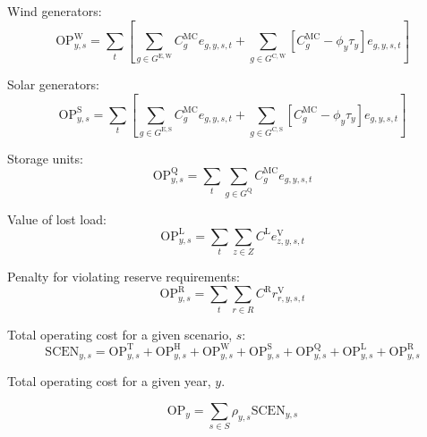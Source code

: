 \documentclass{article}
\newcommand{\sGeneratorsExistingWind}{G^{\mathrm{E,W}}}
\newcommand{\sGeneratorsExistingSolar}{G^{\mathrm{E,S}}}
\newcommand{\sGeneratorsCandidateWind}{G^{\mathrm{C,W}}}
\newcommand{\sGeneratorsCandidateSolar}{G^{\mathrm{C,S}}}
\newcommand{\sStorage}{G^{\mathrm{Q}}}
\newcommand{\sScenarios}{S}
\newcommand{\sZones}{Z}
\newcommand{\sRegions}{R}
\newcommand{\iGenerator}{g}
\newcommand{\iYear}{y}
\newcommand{\iScenario}{s}
\newcommand{\iInterval}{t}
\newcommand{\iZone}{z}
\newcommand{\iRegion}{r}
\newcommand{\cOperatingCost}[1][\iYear,\iScenario]{\mathrm{OP}_{#1}}
\newcommand{\cOperatingCostThermal}[1][\iYear,\iScenario]{\mathrm{OP}^{\mathrm{T}}_{#1}}
\newcommand{\cOperatingCostHydro}[1][\iYear,\iScenario]{\mathrm{OP}^{\mathrm{H}}_{#1}}
\newcommand{\cOperatingCostWind}[1][\iYear,\iScenario]{\mathrm{OP}^{\mathrm{W}}_{#1}}
\newcommand{\cOperatingCostSolar}[1][\iYear,\iScenario]{\mathrm{OP}^{\mathrm{S}}_{#1}}
\newcommand{\cOperatingCostStorage}[1][\iYear,\iScenario]{\mathrm{OP}^{\mathrm{Q}}_{#1}}
\newcommand{\cScenarioDuration}[1][\iYear,\iScenario]{\rho_{#1}}
\newcommand{\cMarginalCost}[1][\iGenerator,\iYear]{C^{\mathrm{MC}}_{#1}}
\newcommand{\cOperatingCostLostLoad}[1][\iYear,\iScenario]{\mathrm{OP}^{\mathrm{L}}_{#1}}
\newcommand{\cLostLoadCost}{C^{\mathrm{L}}}
\newcommand{\cReserveUpViolationPenalty}{C^{\mathrm{R}}}
\newcommand{\cOperatingCostReserveUpViolation}[1][\iYear,\iScenario]{\mathrm{OP}^{\mathrm{R}}_{#1}}
\newcommand{\cOperatingCostScenario}[1][\iYear,\iScenario]{\mathrm{SCEN}_{#1}}
\newcommand{\vBaseline}[1][\iYear]{\phi_{#1}}
\newcommand{\vPermitPrice}[1][\iYear]{\tau_{#1}}
\newcommand{\vEnergy}[1][\iGenerator,\iYear,\iScenario,\iInterval]{e_{#1}}
\newcommand{\vReserveUpViolation}[1][\iRegion,\iYear,\iScenario,\iInterval]{r^{\mathrm{V}}_{#1}}
\newcommand{\vLostLoadEnergy}[1][\iZone,\iYear,\iScenario,\iInterval]{e^{\mathrm{V}}_{#1}}
\begin{document}
Wind generators:
\begin{equation}
\cOperatingCostWind = \sum\limits_{\iInterval}\left[\sum\limits_{\iGenerator \in \sGeneratorsExistingWind} \cMarginalCost[\iGenerator] \vEnergy + \sum\limits_{\iGenerator \in \sGeneratorsCandidateWind} \left[\cMarginalCost[\iGenerator] - \vBaseline \vPermitPrice\right] \vEnergy\right]
\end{equation}

Solar generators:
\begin{equation}
\cOperatingCostSolar = \sum\limits_{\iInterval}\left[\sum\limits_{\iGenerator \in \sGeneratorsExistingSolar} \cMarginalCost[\iGenerator] \vEnergy + \sum\limits_{\iGenerator \in \sGeneratorsCandidateSolar} \left[\cMarginalCost[\iGenerator] - \vBaseline\vPermitPrice\right] \vEnergy\right]
\end{equation}

Storage units:
\begin{equation}
\cOperatingCostStorage = \sum\limits_{\iInterval}\sum\limits_{\iGenerator \in \sStorage} \cMarginalCost[\iGenerator] \vEnergy
\end{equation}

Value of lost load:
\begin{equation}
\cOperatingCostLostLoad = \sum\limits_{\iInterval}\sum\limits_{\iZone \in \sZones} \cLostLoadCost \vLostLoadEnergy
\end{equation}

Penalty for violating reserve requirements:
\begin{equation}
\cOperatingCostReserveUpViolation = \sum\limits_{\iInterval}\sum\limits_{\iRegion \in \sRegions} \cReserveUpViolationPenalty \vReserveUpViolation
\end{equation}

Total operating cost for a given scenario, $\iScenario$:
\begin{equation}
\cOperatingCostScenario = \cOperatingCostThermal + \cOperatingCostHydro + \cOperatingCostWind + \cOperatingCostSolar + \cOperatingCostStorage + \cOperatingCostLostLoad + \cOperatingCostReserveUpViolation
\end{equation}

Total operating cost for a given year, $\iYear$.

\begin{equation}
\cOperatingCost[\iYear] = \sum\limits_{\iScenario \in \sScenarios} \cScenarioDuration \cOperatingCostScenario
\end{equation}
\end{document}
